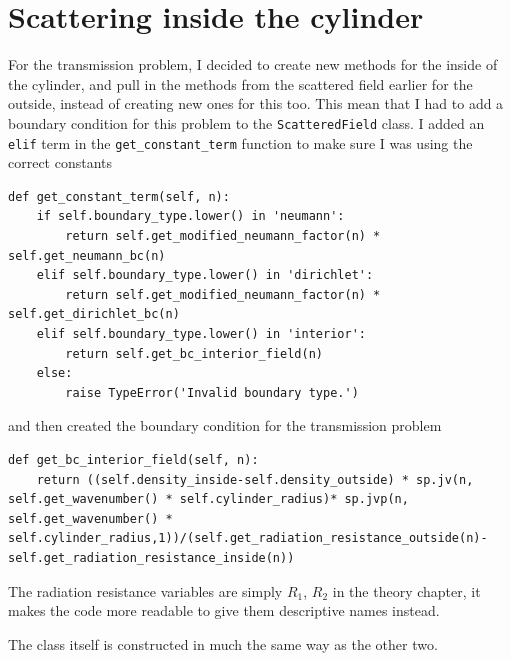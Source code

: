\section{Scattering inside the cylinder}

For the transmission problem, I decided to create new methods for the inside of the cylinder, and pull in the methods from the scattered field earlier for the outside, instead of creating new ones for this too. This mean that I had to add a boundary condition for this problem to the \verb!ScatteredField! class. I added an \verb!elif! term in the \verb!get_constant_term! function to make sure I was using the correct constants

\begin{lstlisting}
def get_constant_term(self, n):
    if self.boundary_type.lower() in 'neumann':
        return self.get_modified_neumann_factor(n) * self.get_neumann_bc(n)
    elif self.boundary_type.lower() in 'dirichlet':
        return self.get_modified_neumann_factor(n) * self.get_dirichlet_bc(n)
    elif self.boundary_type.lower() in 'interior':
        return self.get_bc_interior_field(n)
    else:
        raise TypeError('Invalid boundary type.')
\end{lstlisting}

and then created the boundary condition for the transmission problem

\begin{lstlisting}
def get_bc_interior_field(self, n):
    return ((self.density_inside-self.density_outside) * sp.jv(n, self.get_wavenumber() * self.cylinder_radius)* sp.jvp(n, self.get_wavenumber() * self.cylinder_radius,1))/(self.get_radiation_resistance_outside(n)-self.get_radiation_resistance_inside(n))
\end{lstlisting}

The radiation resistance variables are simply $R_1$, $R_2$ in the theory chapter, it makes the code more readable to give them descriptive names instead.

The class itself is constructed in much the same way as the other two.


